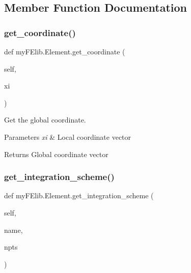 \subsection{Member Function Documentation}
\mbox{\label{classmyFElib_1_1Element_a26c80e9fbf623256b93686058f4b3803}} 
\subsubsection{\texorpdfstring{get\+\_\+coordinate()}{get\_coordinate()}}
{\footnotesize\ttfamily def my\+F\+Elib.\+Element.\+get\+\_\+coordinate (\begin{DoxyParamCaption}\item[{}]{self,  }\item[{}]{xi }\end{DoxyParamCaption})}



Get the global coordinate. 


\begin{DoxyParams}{Parameters}
{\em xi} & Local coordinate vector ~\newline
 \\
\hline
\end{DoxyParams}
\begin{DoxyReturn}{Returns}
Global coordinate vector 
\end{DoxyReturn}
\mbox{\label{classmyFElib_1_1Element_abe19841e55cda21ce54424043125fb73}} 
\subsubsection{\texorpdfstring{get\+\_\+integration\+\_\+scheme()}{get\_integration\_scheme()}}
{\footnotesize\ttfamily def my\+F\+Elib.\+Element.\+get\+\_\+integration\+\_\+scheme (\begin{DoxyParamCaption}\item[{}]{self,  }\item[{}]{name,  }\item[{}]{npts }\end{DoxyParamCaption})}



